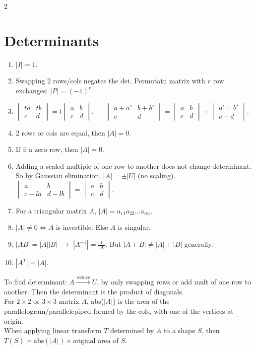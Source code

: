 \documentclass[10pt]{article}
\begin{document}
\begin{multicols*}{2}
\section*{Determinants}
\begin{enumerate}
    \item $|I|=1$.
    \item Swapping 2 rows/cols negates the det. Permutatn matrix with $r$ row exchanges: $|P| = (-1)^r$
    \item $\begin{vmatrix} ta & tb \\ c & d \end{vmatrix} = t \begin{vmatrix} a & b \\ c & d \end{vmatrix}$, $\quad$
    $\begin{vmatrix} a + a' & b + b' \\ c & d \end{vmatrix} = \begin{vmatrix} a & b \\ c & d \end{vmatrix} + \begin{vmatrix} a' + b' \\ c + d \end{vmatrix}$.
    \item 2 rows or cols are equal, then $|A| = 0$.
    \item If $\exists$ a zero row, then $|A| = 0$.
    \item Adding a scaled multiple of one row to another does not change determinant. So by Gaussian elimination, $|A| = \pm|U|$ (no scaling).\\
    $\begin{vmatrix} a & b \\ c - la & d - lb \end{vmatrix} = \begin{vmatrix} a & b \\ c & d \end{vmatrix}$.
    \item For a triangular matrix $A$, $|A| = a_{11}a_{22}\dots a_{nn}$.
    \item $|A| \neq 0 \Leftrightarrow A$ is invertible. Else $A$ is singular.
    \item $|AB| = |A||B|$ $\rightarrow$ $|A^{-1}| = \frac{1}{|A|}$. But $|A + B| \neq |A| + |B|$ generally.
    \item $|A^T| = |A|$.
\end{enumerate}
To find determinant: $A\xrightarrow{\text{reduce}}U$, by only swapping rows or add mult of one row to another. Then the determinant is the product of diagonals.\\
For $2\times 2$ or $3 \times 3$ matrix $A$, abs($|A|$) is the area of the parallelogram/parallelepiped formed by the cols, with one of the vertices at origin.\\
When applying linear transform $T$ determined by $A$ to a shape $S$, then $T(S) = \text{abs}(|A|) \times \text{original area of }S$.


\end{multicols*}
\end{document}
